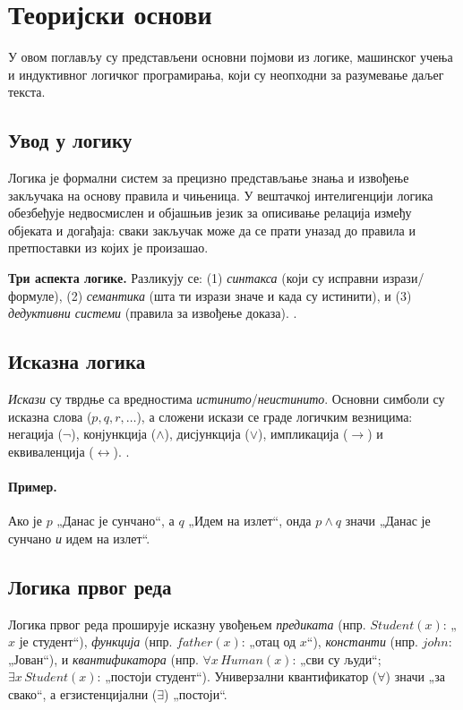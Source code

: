 \section{Теоријски основи}

У овом поглављу су представљени основни појмови из логике, машинског учења и индуктивног логичког програмирања, који су неопходни за разумевање даљег текста.

\subsection{Увод у логику}
Логика је формални систем за прецизно представљање знања и извођење закључака на основу правила и чињеница. У вештачкој интелигенцији логика обезбеђује недвосмислен и објашњив језик за описивање релација између објеката и догађаја: сваки закључак може да се прати уназад до правила и претпоставки из којих је произашао.

\medskip
\noindent\textbf{Три аспекта логике.} Разликују се: (1) \emph{синтакса} (који су исправни изрази/формуле), (2) \emph{семантика} (шта ти изрази значе и када су истинити), и (3) \emph{дедуктивни системи} (правила за извођење доказа). \cite{janii_2004_matematika}.

\subsection{Исказна логика}
\emph{Искази} су тврдње са вредностима \emph{истинито}/\emph{неистинито}. Основни симболи су исказна слова ($p,q,r,\ldots$), а сложени искази се граде логичким везницима: негација ($\neg$), конјункција ($\land$), дисјункција ($\lor$), импликација ($\rightarrow$) и еквиваленција ($\leftrightarrow$). \cite{janii_2004_matematika}.

\paragraph{Пример.} Ако је $p$ „Данас је сунчано“, а $q$ „Идем на излет“, онда $p\land q$ значи „Данас је сунчано \emph{и} идем на излет“.

\subsection{Логика првог реда}
Логика првог реда проширује исказну увођењем \emph{предиката} (нпр. $Student(x)$: „$x$ је студент“), \emph{функција} (нпр. $father(x)$: „отац од $x$“), \emph{константи} (нпр. $john$: „Јован“), и \emph{квантификатора} (нпр. $\forall x\,Human(x)$: „сви су људи“; $\exists x\,Student(x)$: „постоји студент“). Универзални квантификатор ($\forall$) значи „за свако“, а егзистенцијални ($\exists$) „постоји“.

